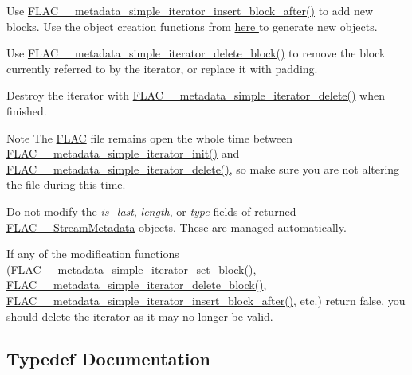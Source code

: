 \begin{DoxyItemize}
\item Use \hyperlink{group__flac__metadata__level1_ga1239ccc5ae1dc3f7cb0e1a61707fafc6}{F\+L\+A\+C\+\_\+\+\_\+metadata\+\_\+simple\+\_\+iterator\+\_\+insert\+\_\+block\+\_\+after()} to add new blocks. Use the object creation functions from \hyperlink{group__flac__metadata__object}{here } to generate new objects.
\item Use \hyperlink{group__flac__metadata__level1_gaf0a1823f95f8097f0d2ff3f67ae30a88}{F\+L\+A\+C\+\_\+\+\_\+metadata\+\_\+simple\+\_\+iterator\+\_\+delete\+\_\+block()} to remove the block currently referred to by the iterator, or replace it with padding.
\item Destroy the iterator with \hyperlink{group__flac__metadata__level1_ga46e64734300a022bb9616b26228b0348}{F\+L\+A\+C\+\_\+\+\_\+metadata\+\_\+simple\+\_\+iterator\+\_\+delete()} when finished.
\end{DoxyItemize}

\begin{DoxyNote}{Note}
The \hyperlink{namespace_f_l_a_c}{F\+L\+AC} file remains open the whole time between \hyperlink{group__flac__metadata__level1_ga2a055cca4e6e06ae62517c8b0fa6e8a3}{F\+L\+A\+C\+\_\+\+\_\+metadata\+\_\+simple\+\_\+iterator\+\_\+init()} and \hyperlink{group__flac__metadata__level1_ga46e64734300a022bb9616b26228b0348}{F\+L\+A\+C\+\_\+\+\_\+metadata\+\_\+simple\+\_\+iterator\+\_\+delete()}, so make sure you are not altering the file during this time.

Do not modify the {\itshape is\+\_\+last}, {\itshape length}, or {\itshape type} fields of returned \hyperlink{struct_f_l_a_c_____stream_metadata}{F\+L\+A\+C\+\_\+\+\_\+\+Stream\+Metadata} objects. These are managed automatically.

If any of the modification functions (\hyperlink{group__flac__metadata__level1_ga7d1ceb2db292c968ae6ac18ecb15c356}{F\+L\+A\+C\+\_\+\+\_\+metadata\+\_\+simple\+\_\+iterator\+\_\+set\+\_\+block()}, \hyperlink{group__flac__metadata__level1_gaf0a1823f95f8097f0d2ff3f67ae30a88}{F\+L\+A\+C\+\_\+\+\_\+metadata\+\_\+simple\+\_\+iterator\+\_\+delete\+\_\+block()}, \hyperlink{group__flac__metadata__level1_ga1239ccc5ae1dc3f7cb0e1a61707fafc6}{F\+L\+A\+C\+\_\+\+\_\+metadata\+\_\+simple\+\_\+iterator\+\_\+insert\+\_\+block\+\_\+after()}, etc.) return {\ttfamily false}, you should delete the iterator as it may no longer be valid. 
\end{DoxyNote}


\subsection{Typedef Documentation}
